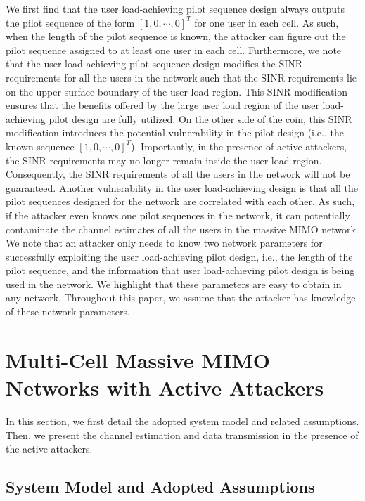 \documentclass[conference]{IEEEtran}
\begin{document}
We first find that the user load-achieving pilot sequence design always outputs the pilot sequence of the form $[1,0,\cdots,0]^T$ for one user in each cell. As such, when the length of the pilot sequence is known, the attacker can figure out the pilot sequence assigned to at least one user in each cell. Furthermore, we note that the user load-achieving pilot sequence design modifies the SINR requirements for all the users in the network such that the SINR requirements lie on the upper surface boundary of the user load region. This SINR modification ensures that the benefits offered by the large user load region of the user load-achieving pilot design are fully utilized. On the other side of the coin, this SINR modification introduces the potential vulnerability in the pilot design (i.e., the known sequence $[1,0,\cdots,0]^T$). Importantly, in the presence of active attackers, the SINR requirements may no longer remain inside the user load region. Consequently, the SINR requirements of all the users in the network will not be guaranteed. Another vulnerability in the user load-achieving design is that all the pilot sequences designed for the network are correlated with each other. As such, if the attacker even knows one pilot sequences in the network, it can potentially contaminate the channel estimates of all the users in the massive MIMO network.
We note that an attacker only needs to know two network parameters for successfully exploiting the user load-achieving pilot design, i.e., the length of the pilot sequence, and the information that user load-achieving pilot design is being used in the network. We highlight that these parameters are easy to obtain in any network. Throughout this paper, we assume that the attacker has knowledge of these network parameters.

\section{Multi-Cell Massive MIMO Networks with Active Attackers}\label{sec:system}

In this section, we first detail the adopted system model and related assumptions. Then, we present the channel estimation and data transmission in the presence of the active attackers.

\subsection{System Model and Adopted Assumptions}
\end{document}
